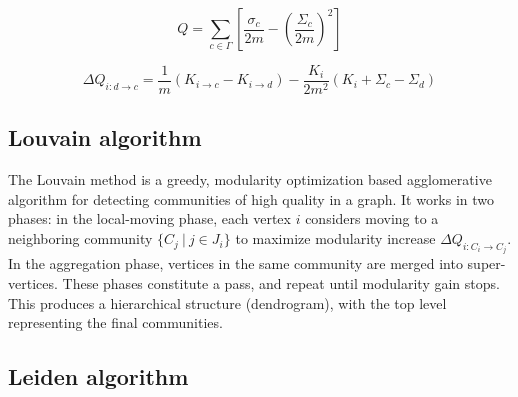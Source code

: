\begin{equation}
\label{eq:modularity}
  Q
  = \sum_{c \in \Gamma} \left[\frac{\sigma_c}{2m} - \left(\frac{\Sigma_c}{2m}\right)^2\right]
\end{equation}

\begin{equation}
\label{eq:delta-modularity}
  \Delta Q_{i: d \rightarrow c}
  = \frac{1}{m} (K_{i \rightarrow c} - K_{i \rightarrow d}) - \frac{K_i}{2m^2} (K_i + \Sigma_c - \Sigma_d)
\end{equation}




\subsection{Louvain algorithm}
\label{sec:about-Louvain}

The Louvain method is a greedy, modularity optimization based agglomerative algorithm for detecting communities of high quality in a graph. It works in two phases: in the local-moving phase, each vertex $i$ considers moving to a neighboring community $\{C_j\ |\ j \in J_i\}$ to maximize modularity increase $\Delta Q_{i:C_i \rightarrow C_j}$. In the aggregation phase, vertices in the same community are merged into super-vertices. These phases constitute a pass, and repeat until modularity gain stops. This produces a hierarchical structure (dendrogram), with the top level representing the final communities.



\subsection{Leiden algorithm}
\label{sec:about-leiden}

